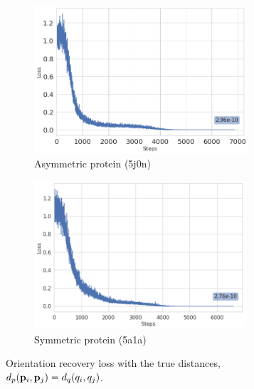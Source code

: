 \begin{figure}[b]
    \centering
    \begin{subfigure}[b]{0.45\textwidth}
        \includegraphics[height=5.5cm]{images/5j0n_perfect_angle_recovery.png}
        \caption{Asymmetric protein (5j0n)}
    \end{subfigure}
    \hfill
    \begin{subfigure}[b]{0.5\textwidth}
    \centering
        \includegraphics[height=5.5cm]{images/5a1a_perfect_angle_recovery.png}
        \caption{Symmetric protein (5a1a)}
    \end{subfigure}
    \caption{ Orientation recovery loss with the true distances, $d_p(\mathbf{p}_i, \mathbf{p}_j) = d_q(q_i, q_j)$.}
    \label{fig:orientation-recovery-loss}
\end{figure}


